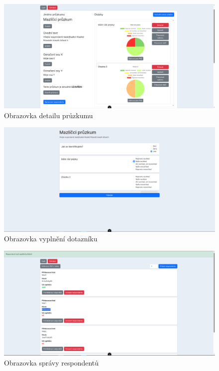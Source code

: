 \begin{figure}[h!]
    \centering
    \includegraphics[width=\textwidth]{images/uiExamples/editSurveyUI.png}
    \caption{Obrazovka detailu průzkumu}
\end{figure}

\begin{figure}[h!]
    \centering
    \includegraphics[width=\textwidth]{images/uiExamples/fillUI.png}
    \caption{Obrazovka vyplnění dotazníku}
\end{figure}

\begin{figure}[h!]
    \centering
    \includegraphics[width=\textwidth]{images/uiExamples/respondentsUI.png}
    \caption{Obrazovka správy respondentů}
\end{figure}


